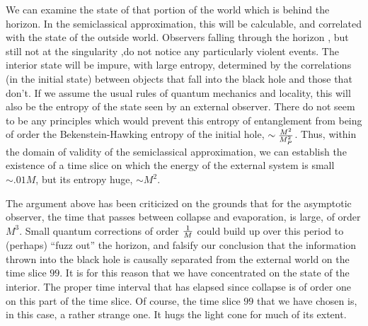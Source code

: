 \ifig{}
{\epsfysize=6cm }

We can examine the state of that portion of the world which is behind
the
horizon.
In the semiclassical approximation, this will be calculable, and
correlated
with
the state of the outside world.  Observers falling through the horizon
, but still not at the singularity ,do not notice any particularly violent
events.  The interior state will be impure, with large entropy,
determined by the correlations (in the initial state) between objects
that fall into the black hole and those that don't. If we assume the
usual rules of quantum mechanics and locality, this will also be the
entropy of the state seen by an external observer.
There do not seem to be any principles which would prevent this entropy
of entanglement from being  of order the Bekenstein-Hawking entropy of
the initial hole, $\sim {M^2 \over M_P^2}$.
Thus, within the domain of validity of the semiclassical approximation, we can
establish the existence of a time slice on which the
energy of the external system is small $\sim .01 M$, but its entropy
huge, $\sim M^2$.

The argument above has been criticized on the grounds that for the asymptotic
observer, the time that passes between collapse and evaporation, is
large,
of order $M^3$.
  Small quantum corrections of order $1\over M$ could build
up over this period to (perhaps) ``fuzz out'' the horizon, and falsify our
conclusion that the information thrown into the black hole is causally
separated from
the external world on the time slice $99$.  It is for this reason
that we have concentrated on the state of the interior.  The proper time
interval that has elapsed since collapse is of order one on this part of
the
time slice.  Of course, the time slice $99$ that we have chosen is, in
this case, a rather strange one.  It hugs the light cone for much of its
extent.


